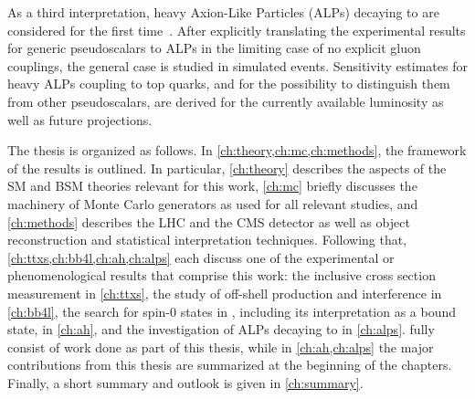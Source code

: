 As a third interpretation, heavy Axion-Like Particles (ALPs) decaying to \ttbar are considered for the first time~\cite{Jeppe:2024sxt}. After explicitly translating the experimental results for generic pseudoscalars to ALPs in the limiting case of no explicit gluon couplings, the general case is studied in simulated events. Sensitivity estimates for heavy ALPs coupling to top quarks, and for the possibility to distinguish them from other pseudoscalars, are derived for the currently available luminosity as well as future projections.

\medskip

The thesis is organized as follows. In \cref{ch:theory,ch:mc,ch:methods}, the framework of the results is outlined. In particular, \cref{ch:theory} describes the aspects of the SM and BSM theories relevant for this work, \cref{ch:mc} briefly discusses the machinery of Monte Carlo generators as used for all relevant studies, and \cref{ch:methods} describes the LHC and the CMS detector as well as object reconstruction and statistical interpretation techniques. Following that, \cref{ch:ttxs,ch:bb4l,ch:ah,ch:alps} each discuss one of the experimental or phenomenological results that comprise this work: the inclusive \ttbar cross section measurement in \cref{ch:ttxs}, the study of off-shell \ttbar production and \tttW interference in \cref{ch:bb4l}, the search for spin-0 states in \ttbar, including its interpretation as a \ttbar bound state, in \cref{ch:ah}, and the investigation of ALPs decaying to \ttbar in \cref{ch:alps}.  fully consist of work done as part of this thesis, while in \cref{ch:ah,ch:alps} the major contributions from this thesis are summarized at the beginning of the chapters. Finally, a short summary and outlook is given in \cref{ch:summary}.



